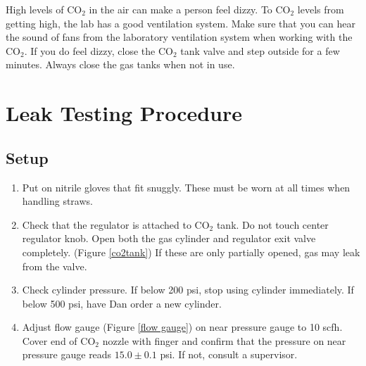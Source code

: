 \documentclass[letterpaper,12pt]{article}
\begin{document}
High levels of CO$_2$ in the air can make a person feel dizzy. To CO$_2$ levels from getting high, the lab has a good ventilation system. Make sure that you can hear the sound of fans from the laboratory ventilation system when working with the CO$_2$. If you do feel dizzy, close the CO$_2$ tank valve and step outside for a few minutes. Always close the gas tanks when not in use.



\newpage

\section{Leak Testing Procedure}

\subsection{Setup}
\begin{enumerate}
	\item Put on nitrile gloves that fit snuggly. These must be worn at all times when handling straws.
	\item Check that the regulator is attached to CO$_2$ tank. Do not touch center regulator knob. Open both the gas cylinder and regulator exit valve completely. (Figure \ref{co2tank}) If these are only partially opened, gas may leak from the valve.   
	\item Check cylinder pressure. If below 200 psi, stop using cylinder immediately. If below 500 psi, have Dan order a new cylinder.
	\item Adjust flow gauge (Figure \ref{flow gauge}) on near pressure gauge to 10 scfh. Cover end of CO$_2$ nozzle with finger and confirm that the pressure on near pressure gauge reads $15.0 \pm 0.1$ psi. If not, consult a supervisor.
\end{enumerate}
\end{document}
